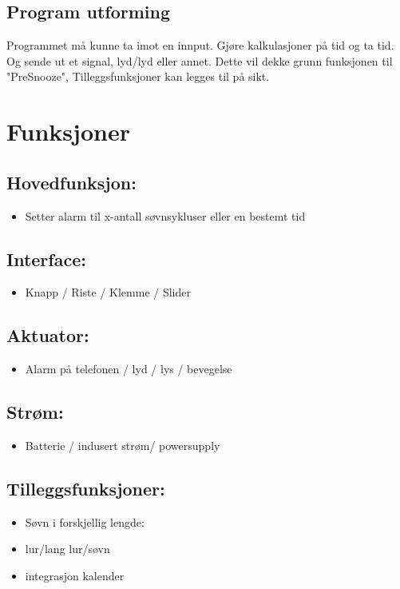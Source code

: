 \documentclass[12pt, a4paper]{article}
\begin{document}
\subsection*{Program utforming}
Programmet må kunne ta imot en innput. Gjøre kalkulasjoner på tid og ta tid. 
Og sende ut et signal, lyd/lyd eller annet. Dette vil dekke grunn funksjonen til "PreSnooze", Tilleggsfunksjoner kan legges til på sikt. 

\pagebreak

\section{Funksjoner}

\subsection {Hovedfunksjon:}
\begin{itemize}
    \item Setter alarm til x-antall søvnsykluser eller en bestemt tid
\end{itemize}


\subsection {Interface: }
\begin{itemize}
    \item Knapp / Riste / Klemme / Slider
\end{itemize}


\subsection {Aktuator:}
\begin{itemize}
    \item Alarm på telefonen / lyd / lys / bevegelse
\end{itemize}


\subsection {Strøm: }
\begin{itemize}
    \item Batterie / indusert strøm/ powersupply
\end{itemize}



\subsection {Tilleggsfunksjoner: }
\begin{itemize}
    \item Søvn i forskjellig lengde: 
    \item lur/lang lur/søvn
    \item integrasjon kalender
\end{itemize}
\end{document}
